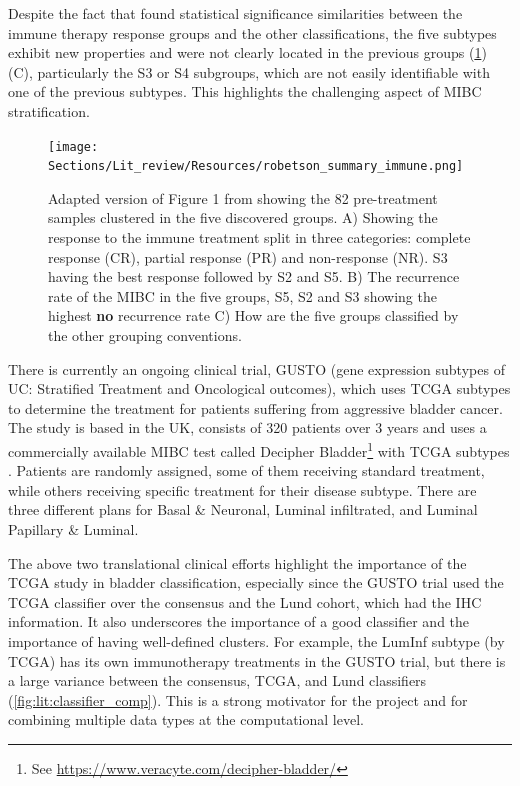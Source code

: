Despite the fact that \citeauthor{Robertson2023-na} found statistical significance similarities between the immune therapy response groups and the other classifications, the five subtypes exhibit new properties and were not clearly located in the previous groups (\cref{fig:lit:immune_rob}) (C), particularly the S3 or S4 subgroups, which are not easily identifiable with one of the previous subtypes. This highlights the challenging aspect of MIBC stratification.


\begin{figure}[!htb]    
    \centering
    \texttt{[image: Sections/Lit\_review/Resources/robetson\_summary\_immune.png]}
    \caption[MIBC subtypes based on the response to immunotherapy]{Adapted version of Figure 1 from \cite{Robertson2023-na} showing the 82 pre-treatment samples clustered in the five discovered groups. A) Showing the response to the immune treatment split in three categories: complete response (CR), partial response (PR) and non-response (NR). S3 having the best response followed by S2 and S5. B) The recurrence rate of the MIBC in the five groups, S5, S2 and S3 showing the highest \textbf{no} recurrence rate C) How are the five groups classified by the other grouping conventions.}
    \label{fig:lit:immune_rob}
\end{figure}


There is currently an ongoing clinical trial, GUSTO (gene expression subtypes of \gls{UC}: Stratified Treatment and Oncological outcomes), which uses TCGA subtypes to determine the treatment for patients suffering from aggressive bladder cancer. The study is based in the UK, consists of 320 patients over 3 years and uses a commercially available MIBC test called Decipher Bladder\footnote{See \url{https://www.veracyte.com/decipher-bladder/}} with TCGA subtypes \citep{Griffin2024-zr}. Patients are randomly assigned, some of them receiving standard treatment, while others receiving specific treatment for their disease subtype. There are three different plans for Basal \& Neuronal, Luminal infiltrated, and Luminal Papillary \& Luminal.

The above two translational clinical efforts highlight the importance of the TCGA study \citet{Robertson2017-mg} in bladder classification, especially since the GUSTO trial used the TCGA classifier over the consensus and the Lund cohort, which had the IHC information. It also underscores the importance of a good classifier and the importance of having well-defined clusters. For example, the LumInf subtype (by TCGA) has its own immunotherapy treatments in the GUSTO trial, but there is a large variance between the consensus, TCGA, and Lund classifiers (\cref{fig:lit:classifier_comp}). This is a strong motivator for the project and for combining multiple data types at the computational level.



